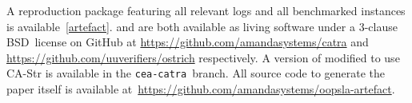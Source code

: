 A reproduction package featuring all relevant logs and all benchmarked instances is available~\cref{artefact}.
\Catra{} and \Ostrich{} are both available as living software
under a 3-clause BSD~license on GitHub at \url{https://github.com/amandasystems/catra} and \url{https://github.com/uuverifiers/ostrich}
respectively. A version of \Ostrich{} modified to use CA-Str is available in the \texttt{cea-catra}~branch. All source code to generate the paper itself
is available at~\url{https://github.com/amandasystems/oopsla-artefact}.